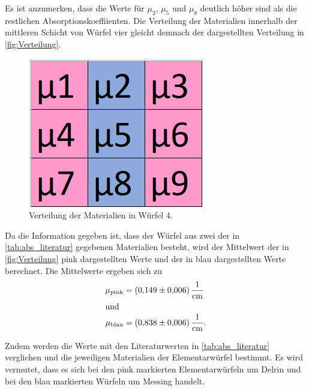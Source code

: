 Es ist anzumerken, dass die Werte für $\mu_2$, $\mu_5$ und $\mu_8$ deutlich höher sind als die restlichen Absorptionskoeffiienten.
Die Verteilung der Materialien innerhalb der mittleren Schicht von Würfel vier gleicht demnach der dargestellten Verteilung in \autoref{fig:Verteilung}.
\begin{figure}[H]
  \centering
  \includegraphics[scale=0.7]{Abbildungen/Verteilung.png}
  \caption{Verteilung der Materialien in Würfel 4.}
  \label{fig:Verteilung}
\end{figure}

Da die Information gegeben ist, dass der Würfel aus zwei der in \autoref{tab:abs_literatur} gegebenen Materialien besteht, wird der
Mittelwert der in \autoref{fig:Verteilung} pink dargestellten Werte und der in blau dargestellten Werte berechnet.
Die Mittelwerte ergeben sich zu
\begin{align*}
 \mu_{\mathrm{pink}} &= \qty{0.149 \pm 0.006}{\per\centi\meter} \\
  \shortintertext{und}
 \mu_{\text{blau}} &= \qty{0.838 \pm 0.006}{\per\centi\meter}.
\end{align*}

Zudem werden die Werte mit den Literaturwerten in
\autoref{tab:abs_literatur} verglichen und die jeweiligen Materialien der Elementarwürfel bestimmt.
Es wird vermutet, dass es sich bei den pink markierten Elementarwürfeln um Delrin und bei den blau markierten Würfeln um Messing handelt.